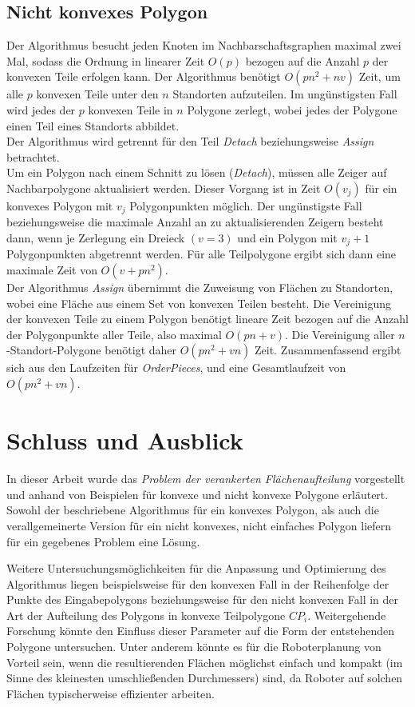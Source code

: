 \documentclass[ngerman]{seminarbeitrag}
\begin{document}
\subsection{Nicht konvexes Polygon}
Der Algorithmus \ord besucht jeden Knoten im Nachbarschaftsgraphen maximal zwei Mal, sodass die Ordnung in linearer Zeit $O(p)$ bezogen auf die Anzahl $p$ der konvexen Teile erfolgen kann.
Der Algorithmus \noncon benötigt $O(pn^{2} + nv)$ Zeit, um alle $p$ konvexen Teile unter den $n$ Standorten aufzuteilen. Im ungünstigsten Fall wird jedes der $p$ konvexen Teile in $n$ Polygone zerlegt, wobei jedes der Polygone einen Teil eines Standorts abbildet.\\
Der Algorithmus \daa wird getrennt für den Teil \emph{Detach} beziehungsweise \emph{Assign} betrachtet.\\
Um ein Polygon nach einem Schnitt zu lösen (\emph{Detach}), müssen alle Zeiger auf Nachbarpolygone aktualisiert werden. Dieser Vorgang ist in Zeit $O(v_{j})$ für ein konvexes Polygon mit $v_{j}$ Polygonpunkten möglich. Der ungünstigste Fall beziehungsweise die maximale Anzahl an zu aktualisierenden Zeigern besteht dann, wenn je Zerlegung ein Dreieck $(v=3)$ und ein Polygon mit $v_{j}+1$ Polygonpunkten abgetrennt werden. Für alle Teilpolygone ergibt sich dann eine maximale Zeit von $O(v + pn^{2})$.\\
Der Algorithmus \emph{Assign} übernimmt die Zuweisung von Flächen zu Standorten, wobei eine Fläche aus einem Set von konvexen Teilen besteht. Die Vereinigung der konvexen Teile zu einem Polygon benötigt lineare Zeit bezogen auf die Anzahl der Polygonpunkte aller Teile, also maximal $O(pn + v)$. Die Vereinigung aller $n$-Standort-Polygone benötigt daher $O(pn^{2}+ vn)$ Zeit. 
Zusammenfassend ergibt sich aus den Laufzeiten für \mbox{\textit{OrderPieces}}, \noncon und \daa eine Gesamtlaufzeit von $O(pn^{2} + vn)$.

\section{Schluss und Ausblick}\label{schluss}
In dieser Arbeit wurde das \emph{Problem der verankerten Flächenaufteilung} vorgestellt und anhand von Beispielen für konvexe und nicht konvexe Polygone erläutert.
Sowohl der beschriebene Algorithmus für ein konvexes Polygon, als auch die verallgemeinerte Version für ein nicht konvexes, nicht einfaches Polygon liefern für ein gegebenes Problem eine Lösung.

Weitere Untersuchungsmöglichkeiten für die Anpassung und Optimierung des Algorithmus liegen beispielsweise für den konvexen Fall in der Reihenfolge der Punkte des Eingabepolygons beziehungsweise für den nicht konvexen Fall in der Art der Aufteilung des Polygons in konvexe Teilpolygone $CP_{i}$. Weitergehende Forschung könnte den Einfluss dieser Parameter auf die Form der entstehenden Polygone untersuchen. Unter anderem könnte es für die Roboterplanung von Vorteil sein, wenn die resultierenden Flächen möglichst einfach und kompakt (im Sinne des kleinesten umschließenden Durchmessers) sind, da Roboter auf solchen Flächen typischerweise effizienter arbeiten.
\end{document}
